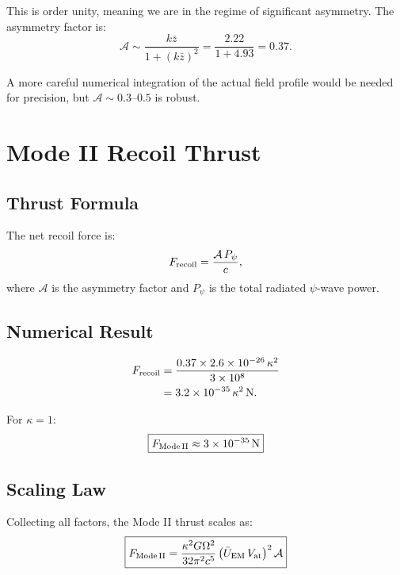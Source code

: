 \documentclass[11pt]{article}
\begin{document}
This is order unity, meaning we are in the regime of significant
asymmetry. The asymmetry factor is:
\begin{equation}
\mathcal{A} \sim \frac{k\bar{z}}{1 + (k\bar{z})^2}
  = \frac{2.22}{1 + 4.93} = 0.37.
\end{equation}

A more careful numerical integration of the actual field profile would
be needed for precision, but $\mathcal{A} \sim 0.3$--$0.5$ is robust.

\section{Mode II Recoil Thrust}\label{sec:thrust}

\subsection{Thrust Formula}

The net recoil force is:
\begin{equation}
F_{\rm recoil} = \frac{\mathcal{A}\,P_\psi}{c},
\end{equation}
where $\mathcal{A}$ is the asymmetry factor and $P_\psi$ is the total
radiated $\psi$-wave power.

\subsection{Numerical Result}

\begin{align}
F_{\rm recoil} &= \frac{0.37 \times 2.6 \times 10^{-26}\,\kappa^2}
  {3 \times 10^8} \\
  &= 3.2 \times 10^{-35}\,\kappa^2\,\text{N}.
\end{align}

For $\kappa = 1$:
\begin{equation}\label{eq:thrust-result}
\boxed{F_{\rm Mode\,II} \approx 3 \times 10^{-35}\,\text{N}}
\end{equation}

\subsection{Scaling Law}

Collecting all factors, the Mode II thrust scales as:
\begin{equation}\label{eq:scaling}
\boxed{F_{\rm Mode\,II} = \frac{\kappa^2 G \Omega^2}{32\pi^2 c^5}
  \left(\bar{U}_{\rm EM}\,V_{\rm at}\right)^2 \mathcal{A}}
\end{equation}
\end{document}
